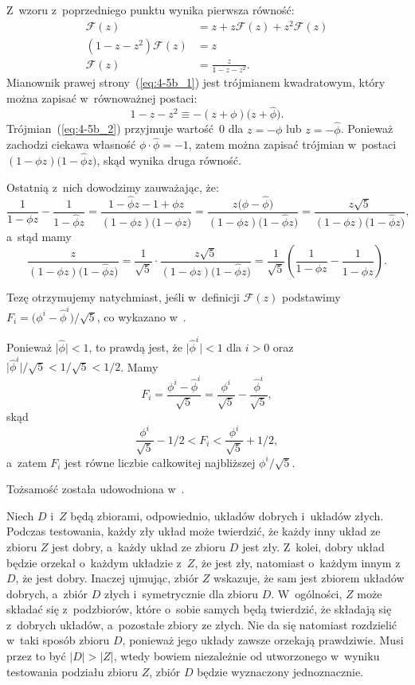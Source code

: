 \subproblem %
Z~wzoru z~poprzedniego punktu wynika pierwsza równość:
\begin{align*}
	\mathcal{F}(z) &= z+z\mathcal{F}(z)+z^2\mathcal{F}(z) \\
	(1-z-z^2)\mathcal{F}(z) &= z \\
	\mathcal{F}(z) &= \frac{z}{1-z-z^2}. \tag{$*$}\label{eq:4-5b_1}
\end{align*}
Mianownik prawej strony~(\ref{eq:4-5b_1}) jest trójmianem kwadratowym, który można zapisać w~równoważnej postaci:
\[
	1-z-z^2 \equiv -(z+\phi)\bigl(z+\widehat\phi\bigr). \tag{$*$}\label{eq:4-5b_2}
\]
Trójmian~(\ref{eq:4-5b_2}) przyjmuje wartość~0 dla $z=-\phi$ lub $z=-\widehat\phi$. Ponieważ zachodzi ciekawa własność $\phi\cdot\widehat\phi=-1$, zatem można zapisać trójmian w~postaci $(1-\phi z)\bigl(1-\widehat\phi z\bigr)$, skąd wynika druga równość.

Ostatnią z~nich dowodzimy zauważając, że:
\[
	\frac{1}{1-\phi z}-\frac{1}{1-\widehat\phi z} = \frac{1-\widehat\phi z-1+\phi z}{(1-\phi z)\bigl(1-\widehat\phi z\bigr)} = \frac{z\bigl(\phi-\widehat\phi\bigr)}{(1-\phi z)\bigl(1-\widehat\phi z\bigr)} = \frac{z\sqrt{5}}{(1-\phi z)\bigl(1-\widehat\phi z\bigr)},
\]
a~stąd mamy
\[
	\frac{z}{(1-\phi z)\bigl(1-\widehat\phi z\bigr)} = \frac{1}{\sqrt{5}}\cdot\frac{z\sqrt{5}}{(1-\phi z)\bigl(1-\widehat\phi z\bigr)} = \frac{1}{\sqrt{5}}\left(\frac{1}{1-\phi z}-\frac{1}{1-\widehat\phi z}\right).
\]

\subproblem %
Tezę otrzymujemy natychmiast, jeśli w~definicji $\mathcal{F}(z)$ podstawimy $F_i=\bigl(\phi^i-\widehat\phi^i\bigr)/\sqrt{5}$, co wykazano w~.

\subproblem %
Ponieważ $\bigl|\widehat\phi\bigr|<1$, to prawdą jest, że $\bigl|\widehat\phi^i\bigr|<1$ dla $i>0$ oraz $\bigl|\widehat\phi^i\bigr|/\sqrt{5}<1/\sqrt{5}<1/2$. Mamy
\[
	F_i = \frac{\phi^i-\widehat\phi^i}{\sqrt{5}} = \frac{\phi^i}{\sqrt{5}}-\frac{\widehat\phi^i}{\sqrt{5}},
\]
skąd
\[
	\frac{\phi^i}{\sqrt{5}}-1/2 < F_i < \frac{\phi^i}{\sqrt{5}}+1/2,
\]
a~zatem $F_i$ jest równe liczbie całkowitej najbliższej $\phi^i/\sqrt{5}$.

\subproblem %
Tożsamość została udowodniona w~.


\subproblem %
Niech $D$ i~$Z$ będą zbiorami, odpowiednio, układów dobrych i~układów złych. Podczas testowania, każdy zły układ może twierdzić, że każdy inny układ ze zbioru $Z$ jest dobry, a~każdy układ ze zbioru $D$ jest zły. Z~kolei, dobry układ będzie orzekał o~każdym układzie z~$Z$, że jest zły, natomiast o~każdym innym z~$D$, że jest dobry. Inaczej ujmując, zbiór $Z$ wskazuje, że sam jest zbiorem układów dobrych, a~zbiór $D$ złych i~symetrycznie dla zbioru $D$. W~ogólności, $Z$ może składać się z~podzbiorów, które o~sobie samych będą twierdzić, że składają się z~dobrych układów, a~pozostałe zbiory ze złych. Nie da się natomiast rozdzielić w~taki sposób zbioru $D$, ponieważ jego układy zawsze orzekają prawdziwie. Musi przez to być $|D|>|Z|$, wtedy bowiem niezależnie od utworzonego w~wyniku testowania podziału zbioru $Z$, zbiór $D$ będzie wyznaczony jednoznacznie.

